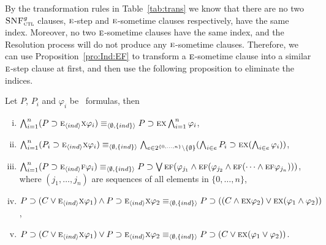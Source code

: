 \documentclass[letterpaper]{article}
\begin{document}

By the transformation rules in Table~\ref{tab:trans} we know that there are no two ${\textsc{SNF}_{\textsc{ctl}}^g}$ clauses,  $\textsc{e}$-step and $\textsc{e}$-sometime clauses respectively, have the same index. Moreover, no two $\textsc{e}$-sometime clauses have the same index, and the Resolution process will do not produce any $\textsc{e}$-sometime clauses. 
Therefore, we can use Proposition~\ref{pro:Ind:EF} to transform a $\textsc{e}$-sometime clause into a similar $\textsc{e}$-step clause at first, and then use the following proposition to eliminate the indices.

\begin{proposition}\label{pro:In2NI}
Let $P$, $P_i$ and $\varphi_i$ be \CTL\ formulas, then
\begin{enumerate}[(i)]
  \item $\bigwedge_{i=1}^n (P\supset \textsc{e}_{{\langle{ind}\rangle}} \textsc{x} \varphi_i)  \equiv_{{\langle{\emptyset, \{ind\}}\rangle}} P\supset \textsc{e} \textsc{x} \bigwedge_{i=1}^n \varphi_i$,
  \item $\bigwedge_{i=1}^n (P_i\supset \textsc{e}_{{\langle{ind}\rangle}} \textsc{x} \varphi_i) \equiv_{{\langle{\emptyset, \{ind\}}\rangle}} \bigwedge_{e \in 2^{\{0,\dots, n\}} \setminus \{\emptyset\}}(\bigwedge_{i\in e}P_i\supset \textsc{e} \textsc{x} (\bigwedge_{i\in e}\varphi_i))$,
  \item $\bigwedge_{i=1}^n (P\supset \textsc{e}_{{\langle{ind}\rangle}} \textsc{f} \varphi_i)  \equiv_{{\langle{\emptyset, \{ind\}}\rangle}} P\supset \bigvee\textsc{e}\textsc{f} (\varphi_{j_1} \wedge \textsc{e}\textsc{f}(\varphi_{j_2} \wedge \textsc{e}\textsc{f}(\dots \wedge \textsc{e}\textsc{f} \varphi_{j_n})))$, where $(j_1, \dots, j_n)$ are sequences of all elements in $\{0, \dots, n\}$,
  \item $P\supset (C \vee \textsc{e}_{{\langle{ind}\rangle}} \textsc{x} \varphi_1) \wedge P \supset \textsc{e}_{{\langle{ind}\rangle}} \textsc{x} \varphi_2 \equiv_{{\langle{\emptyset, \{ind\}}\rangle}} P \supset ((C \wedge \textsc{e} \textsc{x} \varphi_2) \vee \textsc{e} \textsc{x} (\varphi_1 \wedge \varphi_2))$,
  \item $P\supset (C \vee \textsc{e}_{{\langle{ind}\rangle}} \textsc{x} \varphi_1) \vee P \supset \textsc{e}_{{\langle{ind}\rangle}} \textsc{x} \varphi_2 \equiv_{{\langle{\emptyset, \{ind\}}\rangle}} P \supset (C \vee \textsc{e} \textsc{x} (\varphi_1 \vee \varphi_2))$.
\end{enumerate}
\end{proposition}
\end{document}
